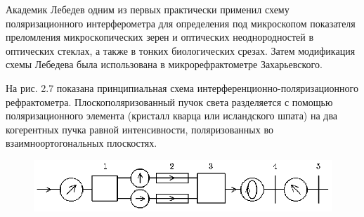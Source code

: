 Академик Лебедев одним из первых практически применил схему
поляризационного интерферометра для определения под микроскопом
показателя преломления микроскопических зерен и оптических
неоднородностей в оптических стеклах, а также в тонких
биологических срезах. Затем модификация схемы Лебедева была
использована в микрорефрактометре Захарьевского.

На рис. 2.7 показана принципиальная схема
интерференционно-поляризационного рефрактометра.
Плоскополяризованный пучок света разделяется с помощью
поляризационного элемента (кристалл кварца или исландского шпата)
на два когерентных пучка равной интенсивности, поляризованных во
взаимноортогональных плоскостях.

\begin{figure}[tbp]
\centerline{\hbox{\includegraphics[scale=0.7]{Ris/ris_eps/ris2_07.eps}}}


\end{figure}

